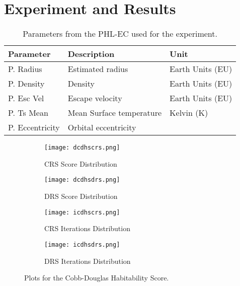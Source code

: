 \documentclass[10pt]{article}
\begin{document}
\section{Experiment and Results}\label{sec:results}

\begin{table}
  \begin{center}
    \begin{tabular}{l l l}
      \toprule
      \textbf{Parameter} & \textbf{Description} & \textbf{Unit}\\
      \midrule
      P. Radius       & Estimated radius         & Earth Units (EU)\\
      P. Density      & Density                  & Earth Units (EU)\\
      P. Esc Vel      & Escape velocity          & Earth Units (EU)\\
      P. Ts Mean      & Mean Surface temperature & Kelvin (K)\\
      P. Eccentricity & Orbital eccentricity\\
      \bottomrule
    \end{tabular}
  \end{center}
  \caption{Parameters from the PHL-EC used for the experiment.}\label{tab:param}
\end{table}


\begin{figure}
  \centering
  \begin{subfigure}[b]{0.38\textwidth}
    \texttt{[image: dcdhscrs.png]}
    \caption{CRS Score Distribution}\label{fig:distcdcrs}
  \end{subfigure}
  \quad
  \begin{subfigure}[b]{0.38\textwidth}
    \texttt{[image: dcdhsdrs.png]}
    \caption{DRS Score Distribution}\label{fig:distcddrs}
  \end{subfigure}

  \begin{subfigure}[b]{0.38\textwidth}
    \texttt{[image: icdhscrs.png]}
    \caption{CRS Iterations Distribution}\label{fig:itercdcrs}
  \end{subfigure}
  \quad
  \begin{subfigure}[b]{0.38\textwidth}
    \texttt{[image: icdhsdrs.png]}
    \caption{DRS Iterations Distribution}\label{fig:itercddrs}
  \end{subfigure}
  \caption{Plots for the Cobb-Douglas Habitability Score.}\label{fig:cdhs}
\end{figure}
\end{document}

